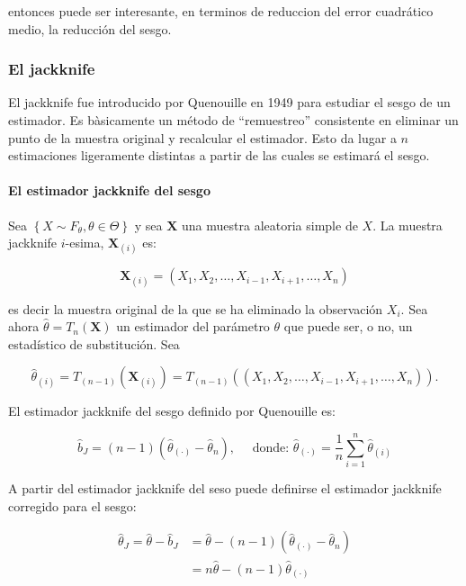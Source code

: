 \documentclass[
]{article}
\begin{document}
entonces puede ser interesante, en terminos de reduccion del error cuadrático medio, la reducción del sesgo.

\subsubsection{El jackknife}\label{el-jackknife}

El jackknife fue introducido por Quenouille en 1949 para estudiar el sesgo de un estimador. Es bàsicamente un método de ``remuestreo'' consistente en eliminar un punto de la muestra original y recalcular el estimador. Esto da lugar a \(n\) estimaciones ligeramente distintas a partir de las cuales se estimará el sesgo.

\paragraph{El estimador jackknife del sesgo}\label{el-estimador-jackknife-del-sesgo}

Sea \(\left\{X \sim F_{\theta}, \theta \in \Theta\right\}\) y sea \(\mathbf{X}\) una muestra aleatoria simple de \(X\). La muestra jackknife \(i\)-esima, \(\mathbf{X}_{(i)}\) es:

\[
\mathbf{X}_{(i)}=\left(X_{1}, X_{2}, \ldots, X_{i-1}, X_{i+1}, \ldots, X_{n}\right)
\]

es decir la muestra original de la que se ha eliminado la observación \(X_{i}\).
Sea ahora \(\hat{\theta}=T_{n}(\mathbf{X})\) un estimador del parámetro \(\theta\) que puede ser, o no, un estadístico de substitución. Sea

\[
\hat{\theta}_{(i)}=T_{(n-1)}\left(\mathbf{X}_{(i)}\right)=T_{(n-1)}\left(\left(X_{1}, X_{2}, \ldots, X_{i-1}, X_{i+1}, \ldots, X_{n}\right)\right) .
\]

El estimador jackknife del sesgo definido por Quenouille es:

\[
\hat{b}_{J}=(n-1)\left(\hat{\theta}_{(\cdot)}-\hat{\theta}_{n}\right), \quad \text { donde: } \hat{\theta}_{(\cdot)}=\frac{1}{n} \sum_{i=1}^{n} \hat{\theta}_{(i)}
\]

A partir del estimador jackknife del seso puede definirse el estimador jackknife corregido para el sesgo:

\[
\begin{aligned}
\hat{\theta}_{J}=\hat{\theta}-\hat{b}_{J} & =\hat{\theta}-(n-1)\left(\hat{\theta}_{(\cdot)}-\hat{\theta}_{n}\right) \\
& =n \hat{\theta}-(n-1) \hat{\theta}_{(\cdot)}
\end{aligned}
\]
\end{document}
